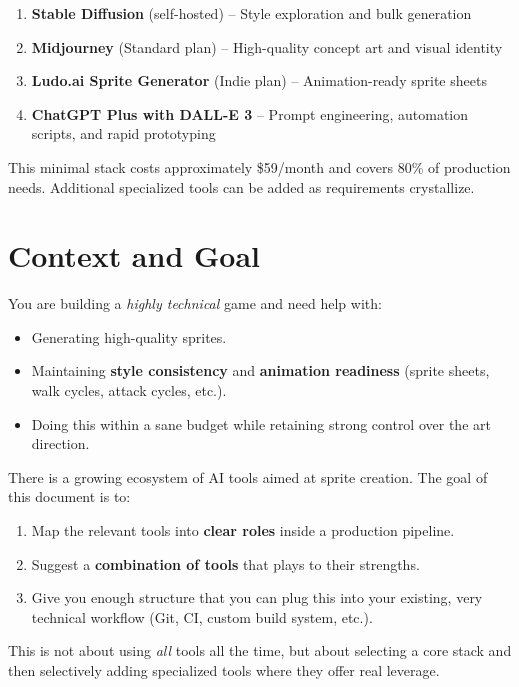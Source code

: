 \documentclass[11pt]{article}
\begin{document}
\begin{enumerate}
    \item \textbf{Stable Diffusion} (self-hosted) -- Style exploration and bulk generation
    \item \textbf{Midjourney} (Standard plan) -- High-quality concept art and visual identity
    \item \textbf{Ludo.ai Sprite Generator} (Indie plan) -- Animation-ready sprite sheets
    \item \textbf{ChatGPT Plus with DALL-E 3} -- Prompt engineering, automation scripts, and rapid prototyping
\end{enumerate}

This minimal stack costs approximately \$59/month and covers 80\% of production needs. Additional specialized tools can be added as requirements crystallize.

\section{Context and Goal}

You are building a \emph{highly technical} game and need help with:
\begin{itemize}
    \item Generating high-quality sprites.
    \item Maintaining \textbf{style consistency} and \textbf{animation readiness} (sprite sheets, walk cycles, attack cycles, etc.).
    \item Doing this within a sane budget while retaining strong control over the art direction.
\end{itemize}

There is a growing ecosystem of AI tools aimed at sprite creation. The goal of this document is to:
\begin{enumerate}
    \item Map the relevant tools into \textbf{clear roles} inside a production pipeline.
    \item Suggest a \textbf{combination of tools} that plays to their strengths.
    \item Give you enough structure that you can plug this into your existing, very technical workflow (Git, CI, custom build system, etc.).
\end{enumerate}

\vspace{0.5em}
This is not about using \emph{all} tools all the time, but about selecting a core stack and then selectively adding specialized tools where they offer real leverage.
\end{document}

